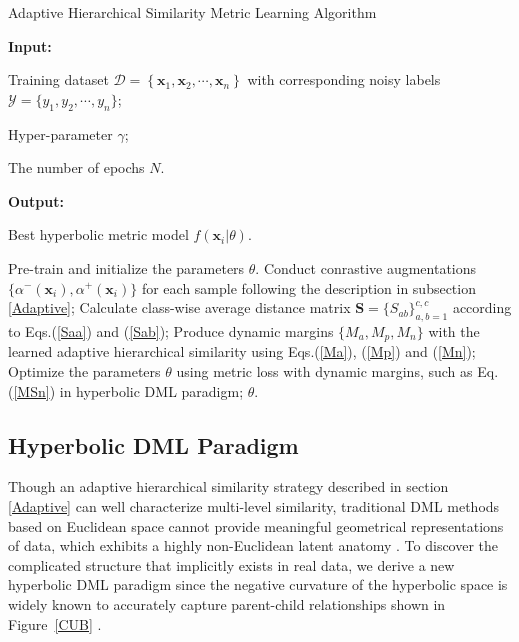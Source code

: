 \documentclass[lettersize,journal]{IEEEtran}
\begin{document}
\begin{algorithm}[t]
	\caption{Adaptive Hierarchical Similarity Metric Learning Algorithm}
	{\bf Input:}
	
	\quad \quad  Training dataset $\mathcal{D} = \left\lbrace \mathbf{x}_1, \mathbf{x}_2, \cdots, \mathbf{x}_n \right\rbrace$ with corresponding noisy labels $\mathcal{Y} = \lbrace y_1, y_2, \cdots, y_n \rbrace$;
	
	\quad \quad Hyper-parameter $\gamma$;
	
	
	\quad \quad  The number of epochs $N$.
	
	{\bf Output:} 
	
	\quad \quad Best hyperbolic metric model $f(\mathbf{x}_i|\theta)$.
	
	\begin{algorithmic}[1]
		\STATE Pre-train and initialize the parameters $\theta$.
		\STATE Conduct conrastive augmentations $\lbrace \alpha^-(\mathbf{x}_i), \alpha^+(\mathbf{x}_i)  \rbrace$ for each sample following the description in subsection \ref{Adaptive}; %
		\STATE Calculate class-wise average distance matrix $\mathbf{S} = \lbrace S_{ab} \rbrace_{a,b = 1}^{c,c}$ according to Eqs.(\ref{Saa}) and (\ref{Sab});
		\STATE Produce dynamic margins $\lbrace M_a, M_p, M_n \rbrace$ with the learned adaptive hierarchical similarity using Eqs.(\ref{Ma}), (\ref{Mp}) and (\ref{Mn});
		\STATE Optimize the parameters $\theta$ using metric loss with dynamic margins, such as Eq.(\ref{MSn})  in  hyperbolic DML paradigm;
		\ENDFOR
		 $\theta$.
	\end{algorithmic}
	\label{Algorithm}
\end{algorithm}

\subsection{Hyperbolic DML Paradigm}
\label{Hyperbolic}

Though an adaptive hierarchical similarity strategy described in section \ref{Adaptive} can well characterize multi-level similarity, traditional DML methods based on Euclidean space cannot provide meaningful geometrical representations of data, which exhibits a highly non-Euclidean latent anatomy \cite{bronstein2017geometric}.  To discover the complicated structure that implicitly exists in real data, we derive a new hyperbolic DML paradigm since the negative
curvature of the hyperbolic space is widely known to accurately
capture parent-child relationships shown in Figure~\ref{CUB} \cite{nickel2017poincare,chami2019hyperbolic}. 
\end{document}
